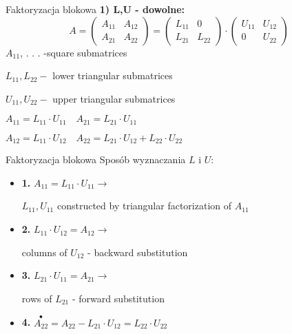 \begin{frame}{Faktoryzacja blokowa}
\textbf{ 1) L,U - dowolne: }
$$
A=\left(\begin{array}{ll}
A_{11} & A_{12}\\
A_{21} & A_{22}
\end{array}\right)=\left(\begin{array}{ll}
L_{11} & 0\\
L_{21} & L_{22}
\end{array}\right)\cdot\left(\begin{array}{ll}
U_{11} & U_{12}\\
0 & U_{22}
\end{array}\right)
$$
$A_{11}$, . . . -square submatrices 

$L_{11}, L_{22}-$ lower triangular submatrices 

$U_{11}, U_{22}-$ upper triangular submatrices
\begin{flushright}
$
A_{11}=L_{11}\cdot U_{11}\quad A_{21}=L_{21}\cdot U_{11}
$
\end{flushright}
\begin{flushright}
$
A_{12}=L_{11}\cdot U_{12}\quad A_{22}=L_{21}\cdot U_{12}+L_{22}\cdot U_{22}
$
\end{flushright}

\end{frame}
\begin{frame}{Faktoryzacja blokowa}
Sposób wyznaczania $L$ i $U$:

\begin{itemize}
\item   \textbf{1.} $A_{11}=L_{11}\cdot U_{11}\rightarrow$

$L_{11}, U_{11}$ constructed by triangular factorization of $A_{11}$
\item \textbf{2.} $ L_{11}\cdot U_{12}=A_{12}\rightarrow$

columns of $U_{12}$ - backward substitution

\item \textbf{3.} $L_{21}\cdot U_{11}=A_{21}\rightarrow$

rows of $L_{21}$ - forward substitution 
\item \textbf{4.}  $\overset{\bullet}{A_{22}}=A_{22}-L_{21}\cdot U_{12}=L_{22}\cdot U_{22}$
\end{itemize}

\end{frame}
